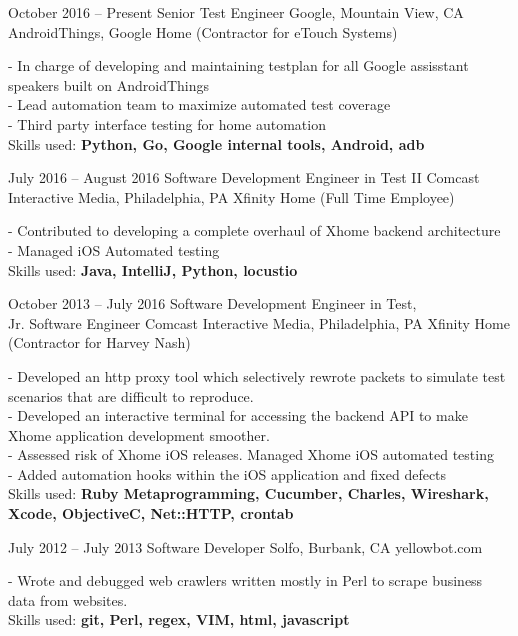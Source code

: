 \documentclass[oldfontcommands]{tccv}
\begin{document}
\begin{eventlist}
\item{October 2016 -- Present}
     {Senior Test Engineer}
     {Google, Mountain View, CA}
     {AndroidThings, Google Home (Contractor for eTouch Systems)}

- In charge of developing and maintaining testplan for all Google assisstant speakers built on AndroidThings \\
- Lead automation team to maximize automated test coverage \\
- Third party interface testing for home automation \\
Skills used: \textbf{Python, Go, Google internal tools, Android, adb}

\item{July 2016 -- August 2016}
     {Software Development Engineer in Test II}
     {Comcast Interactive Media, Philadelphia, PA}
     {Xfinity Home (Full Time Employee)}

- Contributed to developing a complete overhaul of Xhome backend architecture \\
- Managed iOS Automated testing \\
Skills used: \textbf{Java, IntelliJ, Python, locustio}

\item{October 2013 -- July 2016}
     {Software Development Engineer in Test, \\Jr. Software Engineer}
     {Comcast Interactive Media, Philadelphia, PA}
     {Xfinity Home (Contractor for Harvey Nash)}

- Developed an http proxy tool which selectively rewrote packets to simulate test scenarios that are difficult to reproduce. \\
- Developed an interactive terminal for accessing the backend API to make Xhome application development smoother. \\
- Assessed risk of Xhome iOS releases. Managed Xhome iOS automated testing \\
- Added automation hooks within the iOS application and fixed defects \\
Skills used: \textbf{Ruby Metaprogramming, Cucumber, Charles, Wireshark, Xcode, ObjectiveC,  Net::HTTP, crontab}

\item{July 2012 -- July 2013}
     {Software Developer}
     {Solfo, Burbank, CA}
     {yellowbot.com}

- Wrote and debugged web crawlers written mostly in Perl to scrape business data from websites. \\
Skills used: \textbf{git, Perl, regex, VIM, html, javascript}

\end{eventlist}
\end{document}
